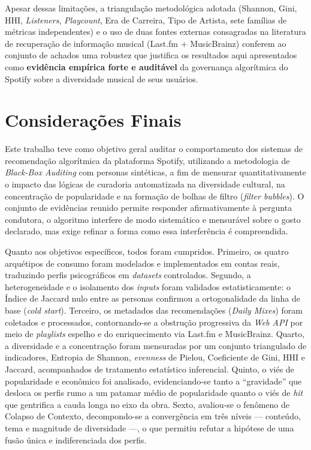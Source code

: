 \documentclass[12pt, %
openright,
oneside, %
a4paper,    %
english,   %
brazil]{facom-ufu-abntex2}
\begin{document}
Apesar dessas limitações, a triangulação metodológica adotada (Shannon, Gini,
HHI, \emph{Listeners}, \emph{Playcount}, Era de Carreira, Tipo de Artista, sete
famílias de métricas independentes) e o uso de duas fontes externas consagradas
na literatura de recuperação de informação musical
(Last.fm $+$ MusicBrainz) conferem ao conjunto de achados uma robustez que
justifica os resultados aqui apresentados como \textbf{evidência empírica forte e
auditável} da governança algorítmica do Spotify sobre a diversidade musical de
seus usuários.

\chapter{Considerações Finais}

Este trabalho teve como objetivo geral auditar o comportamento dos sistemas de
recomendação algorítmica da plataforma Spotify, utilizando a metodologia de
\emph{Black-Box Auditing} com personas sintéticas, a fim de mensurar
quantitativamente o impacto das lógicas de curadoria automatizada na diversidade
cultural, na concentração de popularidade e na formação de bolhas de filtro
(\emph{filter bubbles}). O conjunto de evidências reunido permite responder
afirmativamente à pergunta condutora, o algoritmo interfere de modo sistemático
e mensurável sobre o gosto declarado, mas exige refinar a forma como essa
interferência é compreendida.

Quanto aos objetivos específicos, todos foram cumpridos. Primeiro, os quatro
arquétipos de consumo foram modelados e implementados em contas reais,
traduzindo perfis psicográficos em \emph{datasets} controlados. Segundo, a
heterogeneidade e o isolamento dos \emph{inputs} foram validados
estatisticamente: o Índice de Jaccard nulo entre as personas confirmou a
ortogonalidade da linha de base (\emph{cold start}). Terceiro, os metadados das
recomendações (\emph{Daily Mixes}) foram coletados e processados, contornando-se a
obstrução progressiva da \emph{Web API} por meio de \emph{playlists} espelho e do
enriquecimento via Last.fm e MusicBrainz. Quarto, a diversidade e a concentração
foram mensuradas por um conjunto triangulado de indicadores, Entropia de
Shannon, \emph{evenness} de Pielou, Coeficiente de Gini, HHI e Jaccard,
acompanhados de tratamento estatístico inferencial. Quinto, o viés de
popularidade e econômico foi analisado, evidenciando-se tanto a ``gravidade''
que desloca os perfis rumo a um patamar médio de popularidade quanto o viés de
\emph{hit} que gentrifica a cauda longa no eixo da obra. Sexto, avaliou-se o
fenômeno de Colapso de Contexto, decompondo-se a convergência em três níveis ---
conteúdo, tema e magnitude de diversidade ---, o que permitiu refutar a hipótese
de uma fusão única e indiferenciada dos perfis.
\end{document}
